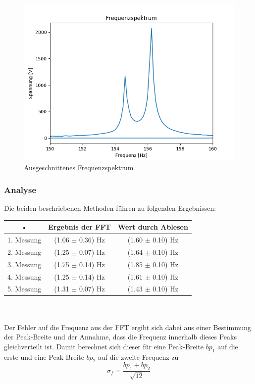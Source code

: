 \documentclass[12pt,a4paper]{article}
\begin{document}
\begin{figure}
\includegraphics[scale=1]{Bilder/Frequenzspektrum_zoom.png}
\centering
\caption{Ausgeschnittenes Frequenzspektrum}
\label{Schwebung_Frequenzspektrum_zoom}
\end{figure}
\subsubsection{Analyse}
Die beiden beschriebenen Methoden führen zu folgenden Ergebnissen: \\
\begin{tabular}{|c|c|c|}
\hline 
• & Ergebnis der FFT & Wert durch Ablesen \\ 
\hline 
1. Messung & (1.06 $\pm$ 0.36) Hz & (1.60 $\pm$ 0.10) Hz \\ 
\hline 
2. Messung & (1.25 $\pm$ 0.07) Hz & (1.64 $\pm$ 0.10) Hz \\ 
\hline 
3. Messung & (1.75 $\pm$ 0.14) Hz & (1.85 $\pm$ 0.10) Hz \\ 
\hline 
4. Messung & (1.25 $\pm$ 0.14) Hz & (1.61 $\pm$ 0.10) Hz \\ 
\hline 
5. Messung & (1.31 $\pm$ 0.07) Hz & (1.43 $\pm$ 0.10) Hz \\ 
\hline 
\end{tabular} \\
\\Der Fehler auf die Frequenz aus der FFT ergibt sich dabei aus einer Bestimmung der Peak-Breite und der Annahme, dass die Frequenz innerhalb dieses Peaks gleichverteilt ist. Damit berechnet sich dieser für eine Peak-Breite $bp_1$ auf die erste und eine Peak-Breite $bp_2$ auf die zweite Frequenz zu
\begin{equation}
\sigma_f = \dfrac{bp_1 + bp_2}{\sqrt{12}}
\end{equation}
\end{document}
